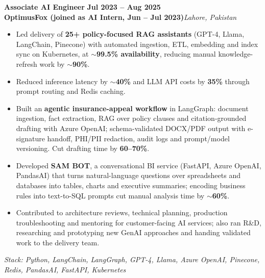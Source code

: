 \documentclass[a4paper,10pt]{article}
\newcommand{\role}[4]{%
  {\large\bfseries #1}\hfill{\bfseries\color{accent} #2}\\
  {\color{accent2}\bfseries #3}\hfill{\color{muted}\itshape #4}\par
}
\newcommand{\stack}[1]{{\color{muted}\small\itshape Stack: #1}\par}
\begin{document}
\role{Associate AI Engineer}{Jul 2023 -- Aug 2025}{OptimusFox (joined as AI Intern, Jun -- Jul 2023)}{Lahore, Pakistan}
\begin{itemize}
  \item Led delivery of \textbf{25+ policy-focused RAG assistants} (GPT-4, Llama, LangChain, Pinecone) with automated ingestion, ETL, embedding and index sync on Kubernetes, at \textbf{$\sim$99.5\% availability}, reducing manual knowledge-refresh work by \textbf{$\sim$90\%}.
  \item Reduced inference latency by \textbf{$\sim$40\%} and LLM API costs by \textbf{35\%} through prompt routing and Redis caching.
  \item Built an \textbf{agentic insurance-appeal workflow} in LangGraph: document ingestion, fact extraction, RAG over policy clauses and citation-grounded drafting with Azure OpenAI; schema-validated DOCX/PDF output with e-signature handoff, PHI/PII redaction, audit logs and prompt/model versioning. Cut drafting time by \textbf{60--70\%}.
  \item Developed \textbf{SAM BOT}, a conversational BI service (FastAPI, Azure OpenAI, PandasAI) that turns natural-language questions over spreadsheets and databases into tables, charts and executive summaries; encoding business rules into text-to-SQL prompts cut manual analysis time by \textbf{$\sim$60\%}.
  \item Contributed to architecture reviews, technical planning, production troubleshooting and mentoring for customer-facing AI services; also ran R\&D, researching and prototyping new GenAI approaches and handing validated work to the delivery team.
\end{itemize}
\stack{Python, LangChain, LangGraph, GPT-4, Llama, Azure OpenAI, Pinecone, Redis, PandasAI, FastAPI, Kubernetes}

\end{document}
